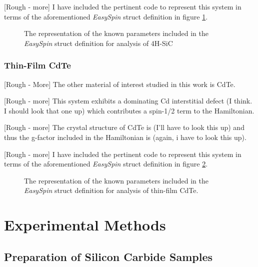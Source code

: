 \documentclass[oneside, astronomy, noacknowlegments]{BYUPhys}
\begin{document}
[Rough - more] I have included the pertinent code to represent this system in terms of the aforementioned \textit{EasySpin} struct definition in figure \ref{fig:SiCParams}.

\begin{figure}
    \caption[The \textit{EasySpin} representation of SiC]{\label{fig:SiCParams}
     The representation of the known parameters included in the \textit{EasySpin} struct definition for analysis of 4H-SiC}
 \end{figure}
 
\subsection{Thin-Film CdTe}

[Rough - More] The other material of interest studied in this work is CdTe.

[Rough - more] This system exhibits a dominating Cd interstitial defect (I think. I should look that one up) which contributes a spin-1/2 term to the Hamiltonian.

[Rough - more] The crystal structure of CdTe is (I'll have to look this up) and thus the g-factor included in the Hamiltonian is (again, i have to look this up).

[Rough - more] I have included the pertinent code to represent this system in terms of the aforementioned \textit{EasySpin} struct definition in figure \ref{fig:CdTeParams}.

\begin{figure}
    \caption[The \textit{EasySpin} representation of CdTe]{\label{fig:CdTeParams}
     The representation of the known parameters included in the \textit{EasySpin} struct definition for analysis of thin-film CdTe.}
 \end{figure}
 










\chapter{Experimental Methods}

\section{Preparation of Silicon Carbide Samples}
\label{sec:SiCSamples}
\end{document}
